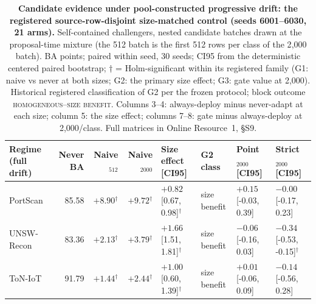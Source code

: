 \begin{table}[t]
\centering
\caption{\textbf{Candidate evidence under pool-constructed progressive drift: the registered
source-row-disjoint size-matched control (seeds 6001--6030, 21 arms).} Self-contained challengers, nested
candidate batches drawn at the proposal-time mixture (the 512 batch is the first 512 rows
per class of the 2{,}000 batch). BA points; paired within seed, 30 seeds; CI95 from the
deterministic centered paired bootstrap; $\dagger$ = Holm-significant within its registered
family (G1: naive vs never at both sizes; G2: the primary size effect; G3: gate value at
2{,}000). Historical registered classification of G2 per the frozen protocol; block outcome
\textsc{homogeneous--size benefit}. Columns 3--4: always-deploy
minus never-adapt at each size; column 5: the size effect; columns 7--8: gate minus
always-deploy at 2{,}000/class. Full matrices in Online Resource~1, \S S9.}
\label{tab:size_matched_drift}
\footnotesize
\setlength{\tabcolsep}{3pt}
\begin{tabular}{l r r r l l l l}
\toprule
Regime (full drift) & Never BA & Naive$_{512}$ & Naive$_{2000}$ &
Size effect [CI95] & G2 class & Point$_{2000}$ [CI95] & Strict$_{2000}$ [CI95] \\
\midrule
PortScan & 85.58 & $+8.90$$^{\dagger}$ & $+9.72$$^{\dagger}$ & $+0.82$ [0.67, 0.98]$^{\dagger}$ & size benefit & $+0.15$ [-0.03, 0.39] & $-0.00$ [-0.17, 0.23] \\
UNSW-Recon & 83.36 & $+2.13$$^{\dagger}$ & $+3.79$$^{\dagger}$ & $+1.66$ [1.51, 1.81]$^{\dagger}$ & size benefit & $-0.06$ [-0.16, 0.03] & $-0.34$ [-0.53, -0.15]$^{\dagger}$ \\
ToN-IoT & 91.79 & $+1.44$$^{\dagger}$ & $+2.44$$^{\dagger}$ & $+1.00$ [0.60, 1.39]$^{\dagger}$ & size benefit & $+0.01$ [-0.06, 0.09] & $-0.14$ [-0.56, 0.28] \\
\bottomrule
\end{tabular}
\end{table}
